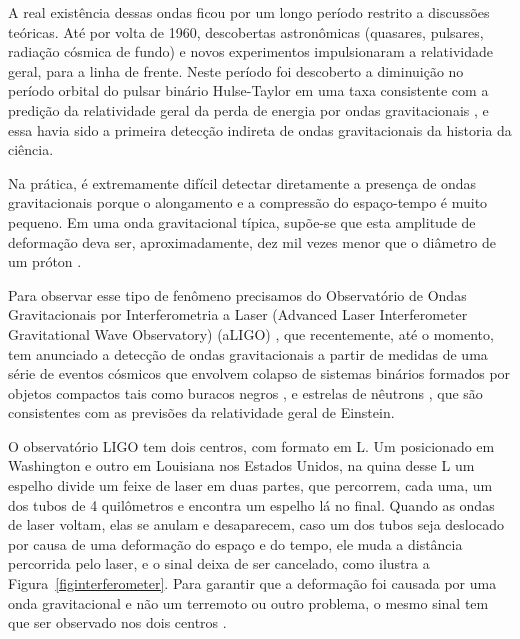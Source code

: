 A real existência dessas ondas ficou por um longo período restrito a discussões teóricas. Até por volta de 1960, descobertas astronômicas (quasares, pulsares, radiação cósmica de fundo) e novos experimentos impulsionaram a relatividade geral, para a linha de frente. Neste período foi descoberto a diminuição no período orbital do pulsar binário Hulse-Taylor em uma taxa consistente com a predição da relatividade geral da perda de energia por ondas gravitacionais \cite{weisberg2004relativistic}, e essa havia sido a primeira detecção indireta de ondas gravitacionais da historia da ciência.

Na prática, é extremamente difícil detectar diretamente a presença de ondas gravitacionais porque o alongamento e a compressão do espaço-tempo é muito pequeno. Em uma onda gravitacional típica, supõe-se que esta amplitude de deformação deva ser, aproximadamente, dez mil vezes menor que o diâmetro de um próton \cite{LSC-VIRGO}.

Para observar esse tipo de fenômeno precisamos do Observatório de Ondas Gravitacionais por Interferometria a Laser (Advanced Laser Interferometer Gravitational Wave Observatory) (aLIGO) \cite{PhysRevLett.116.131103,0264-9381-32-7-074001}, que recentemente, até o momento, tem anunciado a detecção de ondas gravitacionais a partir de medidas de uma série de eventos cósmicos que envolvem colapso de sistemas binários formados por objetos compactos tais como buracos negros \cite{abbott2016observation,ligo2016gw151226,scientific2017gw170104,abbott2017gw170814}, e estrelas de nêutrons \cite{abbott2017gw170817}, que são consistentes com as previsões da relatividade geral de Einstein.

O observatório LIGO tem dois centros, com formato em L. Um posicionado em Washington e outro em Louisiana nos Estados Unidos, na quina desse L um espelho divide um feixe de laser em duas partes, que percorrem, cada uma, um dos tubos de 4 quilômetros e encontra um espelho lá no final. Quando as ondas de laser voltam, elas se anulam e desaparecem, caso um dos tubos seja deslocado por causa de uma deformação do espaço e do tempo, ele muda a distância percorrida pelo laser, e o sinal deixa de ser cancelado, como ilustra a Figura~\ref{figinterferometer}. Para garantir que a deformação foi causada por uma onda gravitacional e não um terremoto ou outro problema, o mesmo sinal tem que ser observado nos dois centros \cite{PhysRevLett.116.131103}. 


